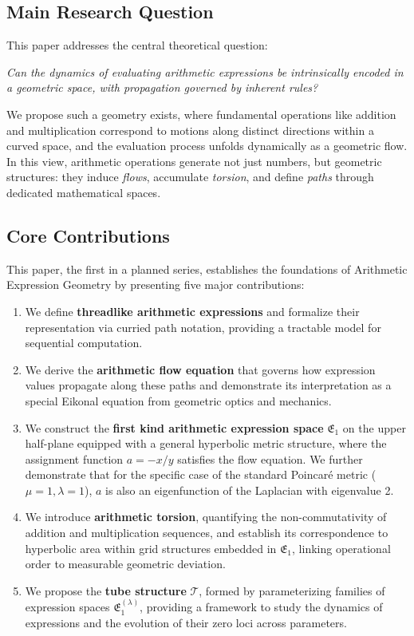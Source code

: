 \documentclass[12pt]{article}
\begin{document}
\subsection{Main Research Question}
This paper addresses the central theoretical question:
\begin{center}
\emph{Can the dynamics of evaluating arithmetic expressions be intrinsically encoded in a geometric space, with propagation governed by inherent rules?}
\end{center}
We propose such a geometry exists, where fundamental operations like addition and multiplication correspond to motions along distinct directions within a curved space, and the evaluation process unfolds dynamically as a geometric flow. In this view, arithmetic operations generate not just numbers, but geometric structures: they induce \emph{flows}, accumulate \emph{torsion}, and define \emph{paths} through dedicated mathematical spaces.

\subsection{Core Contributions}
This paper, the first in a planned series, establishes the foundations of Arithmetic Expression Geometry by presenting five major contributions:
\begin{enumerate}[label=\textbf{C\arabic*.}, leftmargin=*, widest=C5, align=left] %
  \item We define \textbf{threadlike arithmetic expressions} and formalize their representation via curried path notation, providing a tractable model for sequential computation.
  \item We derive the \textbf{arithmetic flow equation} that governs how expression values propagate along these paths and demonstrate its interpretation as a special Eikonal equation from geometric optics and mechanics.
  \item We construct the \textbf{first kind arithmetic expression space} \( \mathfrak{E}_1 \) on the upper half-plane equipped with a general hyperbolic metric structure, where the assignment function \( a = -x/y \) satisfies the flow equation. We further demonstrate that for the specific case of the standard Poincaré metric (\(\mu=1, \lambda=1\)), \(a\) is also an eigenfunction of the Laplacian with eigenvalue 2.
  \item We introduce \textbf{arithmetic torsion}, quantifying the non-commutativity of addition and multiplication sequences, and establish its correspondence to hyperbolic area within grid structures embedded in \( \mathfrak{E}_1 \), linking operational order to measurable geometric deviation.
  \item We propose the \textbf{tube structure} \( \mathcal{T} \), formed by parameterizing families of expression spaces \( \mathfrak{E}_1^{(\lambda)} \), providing a framework to study the dynamics of expressions and the evolution of their zero loci across parameters.
\end{enumerate}
\end{document}
